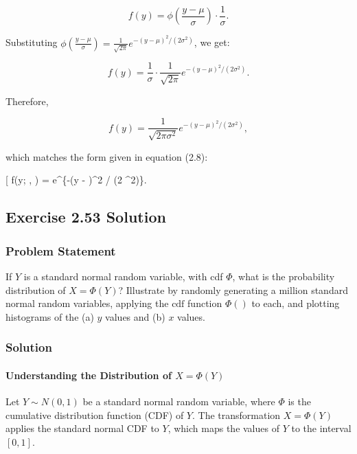 \documentclass[
]{article}
\begin{document}
\[
f(y) = \phi \left( \frac{y - \mu}{\sigma} \right) \cdot \frac{1}{\sigma}.
\]

Substituting
\(\phi \left( \frac{y - \mu}{\sigma} \right) = \frac{1}{\sqrt{2 \pi}} e^{-(y - \mu)^2 / (2 \sigma^2)}\),
we get:

\[
f(y) = \frac{1}{\sigma} \cdot \frac{1}{\sqrt{2 \pi}} e^{-(y - \mu)^2 / (2 \sigma^2)}.
\]

Therefore,

\[
f(y) = \frac{1}{\sqrt{2 \pi \sigma^2}} e^{-(y - \mu)^2 / (2 \sigma^2)},
\]

which matches the form given in equation (2.8):

{[} f(y; \mu, \sigma) =  e\^{}\{-(y -
\mu)\^{}2 / (2 \sigma\^{}2)\}.

\hypertarget{exercise-2.53-solution}{%
\subsection{Exercise 2.53 Solution}\label{exercise-2.53-solution}}

\hypertarget{problem-statement-5}{%
\subsubsection{Problem Statement}\label{problem-statement-5}}

If \(Y\) is a standard normal random variable, with cdf \(\Phi\), what
is the probability distribution of \(X = \Phi(Y)\)? Illustrate by
randomly generating a million standard normal random variables, applying
the \(\text{cdf}\) function \(\Phi()\) to each, and plotting histograms
of the (a) \(y\) values and (b) \(x\) values.

\hypertarget{solution-5}{%
\subsubsection{Solution}\label{solution-5}}

\hypertarget{understanding-the-distribution-of-x-phiy}{%
\paragraph{\texorpdfstring{Understanding the Distribution of
\(X = \Phi(Y)\)}{Understanding the Distribution of X = \textbackslash Phi(Y)}}\label{understanding-the-distribution-of-x-phiy}}

Let \(Y \sim N(0,1)\) be a standard normal random variable, where
\(\Phi\) is the cumulative distribution function (CDF) of \(Y\). The
transformation \(X = \Phi(Y)\) applies the standard normal CDF to \(Y\),
which maps the values of \(Y\) to the interval \([0, 1]\).
\end{document}
